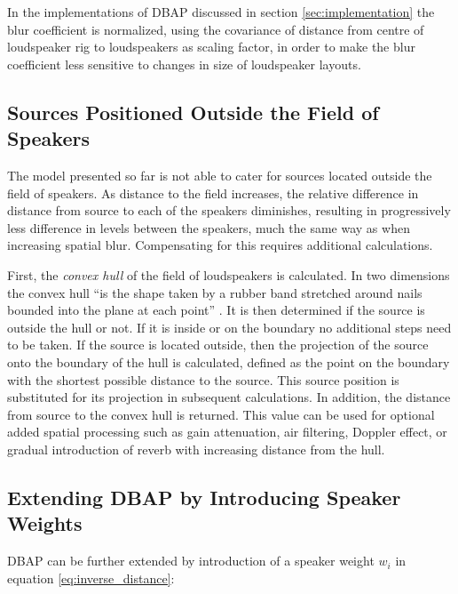 \documentclass[twoside,10pt]{article}
\begin{document}
In the implementations of DBAP discussed in section \ref{sec:implementation} the blur coefficient is normalized, using the covariance of distance from centre of loudspeaker rig to loudspeakers as scaling factor, in order to make the blur coefficient less sensitive to changes in size of loudspeaker layouts.



\subsection{Sources Positioned Outside the Field of Speakers}

The model presented so far is not able to cater for sources located outside the field of speakers. As distance to the field increases, the relative difference in distance from source to each of the speakers diminishes, resulting in progressively less difference in levels between the speakers, much the same way as when increasing spatial blur. Compensating for this requires additional calculations.

First, the \emph{convex hull} of the field of loudspeakers is calculated. In two dimensions the convex hull ``is the shape taken by a rubber band stretched around nails bounded into the plane at each point'' \cite{Rourke:1998_geometry}. It is then determined if the source is outside the hull or not. If it is inside or on the boundary no additional steps need to be taken. If the source is located outside, then the projection of the source onto the boundary of the hull is calculated, defined as the point on the boundary with the shortest possible distance to the source. This source position is  substituted for its projection in subsequent calculations. In addition, the distance from source to the convex hull is returned. This value can be used for optional added spatial processing such as gain attenuation, air filtering, Doppler effect, or gradual introduction of reverb with increasing distance from the hull.


\subsection{Extending DBAP by Introducing Speaker Weights}

DBAP can be further extended by introduction of a speaker weight $w_{i}$ in equation \ref{eq:inverse_distance}:
\end{document}
